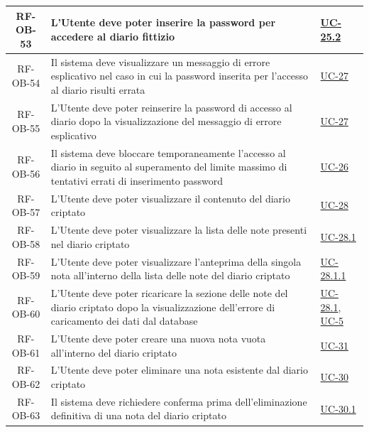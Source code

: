 \documentclass[a4paper,12pt]{article}
\begin{document}
\begin{center}
\begin{longtable}{|c|p{8.5cm}|>{\centering\arraybackslash}p{4cm}|}
RF-OB-53 & L'Utente deve poter inserire la password per accedere al diario fittizio & \hyperref[subsec:UC-25.2]{UC-25.2} \\
\hline

RF-OB-54 & Il sistema deve visualizzare un messaggio di errore esplicativo nel caso in cui la password inserita per l'accesso al diario risulti errata & \hyperref[subsec:UC-27]{UC-27} \\
\hline

RF-OB-55 & L'Utente deve poter reinserire la password di accesso al diario dopo la visualizzazione del messaggio di errore esplicativo & \hyperref[subsec:UC-27]{UC-27} \\
\hline

RF-OB-56 & Il sistema deve bloccare temporaneamente l'accesso al diario in seguito al superamento del limite massimo di tentativi errati di inserimento password & \hyperref[subsec:UC-26]{UC-26} \\
\hline

RF-OB-57 & L'Utente deve poter visualizzare il contenuto del diario criptato & \hyperref[subsec:UC-28]{UC-28} \\
\hline

RF-OB-58 & L'Utente deve poter visualizzare la lista delle note presenti nel diario criptato & \hyperref[subsec:UC-28.1]{UC-28.1} \\
\hline

RF-OB-59 & L'Utente deve poter visualizzare l'anteprima della singola nota all'interno della lista delle note del diario criptato & \hyperref[subsec:UC-28.1.1]{UC-28.1.1} \\
\hline

RF-OB-60 & L'Utente deve poter ricaricare la sezione delle note del diario criptato dopo la visualizzazione dell'errore di caricamento dei dati dal database & \hyperref[subsec:UC-28.1]{UC-28.1}, \hyperref[sec:UC-5]{UC-5} \\
\hline

RF-OB-61 & L'Utente deve poter creare una nuova nota vuota all'interno del diario criptato & \hyperref[subsec:UC-31]{UC-31} \\
\hline

RF-OB-62 & L'Utente deve poter eliminare una nota esistente dal diario criptato & \hyperref[subsec:UC-30]{UC-30} \\
\hline

RF-OB-63 & Il sistema deve richiedere conferma prima dell'eliminazione definitiva di una nota del diario criptato & \hyperref[subsec:UC-30.1]{UC-30.1} \\
\hline


\end{longtable}
\end{center}
\end{document}
